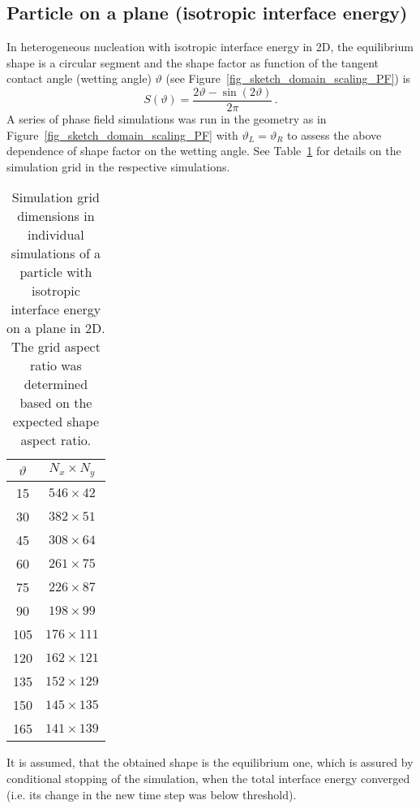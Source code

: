 \subsection{Particle on a plane (isotropic interface energy)}
In heterogeneous nucleation with isotropic interface energy in 2D, the equilibrium shape is a circular segment and the shape factor as function of the tangent contact angle (wetting angle) $\vartheta$ (see Figure~\ref{fig_sketch_domain_scaling_PF}) is
\begin{equation}
	S(\vartheta) = \frac{2\vartheta - \sin(2\vartheta)}{2\pi} \,.
\end{equation}
A series of phase field simulations was run in the geometry as in Figure~\ref{fig_sketch_domain_scaling_PF} with $\vartheta_L=\vartheta_R$ to assess the above dependence of shape factor on the wetting angle. See Table~\ref{tab_PF_NPA_param_particle_onplane} for details on the simulation grid in the respective simulations.
\begin{table}
	\centering
	\caption{Simulation grid dimensions in individual simulations of a particle with isotropic interface energy on a plane in 2D. The grid aspect ratio was determined based on the expected shape aspect ratio.}
	\label{tab_PF_NPA_param_particle_onplane}
	\begin{tabular}{c|c}
		$\vartheta$ & $N_x\times N_y$ \\ \hline
	 	15	&	$546\times 42$	\\
	 	30	&	$382\times 51$	\\
	 	45	&	$308\times 64$	\\
	 	60	&	$261\times 75$	\\
	 	75	&	$226\times 87$	\\
	 	90	&	$198\times 99$	\\
	 	105	&	$176\times 111$	\\
	 	120	&	$162\times 121$	\\
	 	135	&	$152\times 129$	\\
	 	150	&	$145\times 135$	\\
	 	165	&	$141\times 139$	
	\end{tabular}
\end{table}
It is assumed, that the obtained shape is the equilibrium one, which is assured by conditional stopping of the simulation, when the total interface energy converged (i.e. its change in the new time step was below threshold). 

